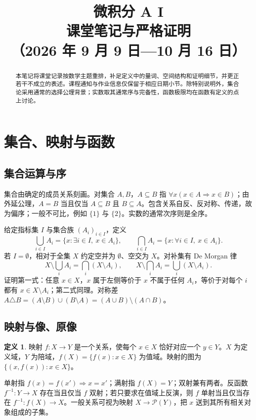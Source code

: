\documentclass[11pt,a4paper,UTF8]{ctexart}
\title{微积分 A I\\课堂笔记与严格证明\\（2026 年 9 月 9 日—10 月 16 日）}
\author{}
\date{}
\theoremstyle{definition}\newtheorem{definition}[theorem]{定义}
\theoremstyle{remark}\newtheorem{remark}[theorem]{说明}
\begin{document}
\maketitle
\begin{abstract}
本笔记将课堂记录按数学主题重排，补足定义中的量词、空间结构和证明细节，并更正若干不成立的表述。课程通知与作业信息仅保留于相应日期小节。除特别说明外，集合论采用通常的选择公理背景；实数取其通常序与完备性，函数极限均在函数有定义的点上讨论。
\end{abstract}
\tableofcontents\newpage

\section{集合、映射与函数}
\subsection{集合运算与序}
集合由确定的成员关系刻画。对集合 $A,B$，$A\subseteq B$ 指 $\forall x(x\in A\Rightarrow x\in B)$；由外延公理，$A=B$ 当且仅当 $A\subseteq B$ 且 $B\subseteq A$。包含关系自反、反对称、传递，故为偏序；一般不可比，例如 $\{1\}$ 与 $\{2\}$。实数的通常次序则是全序。

给定指标集 $I$ 与集合族 $(A_i)_{i\in I}$，定义
\[
\bigcup_{i\in I}A_i=\{x:\exists i\in I,\ x\in A_i\},\qquad
\bigcap_{i\in I}A_i=\{x:\forall i\in I,\ x\in A_i\}.
\]
若 $I=\emptyset$，相对于全集 $X$ 约定空并为 $\emptyset$、空交为 $X$。对补集有 De Morgan 律
\[
X\setminus\bigcup_i A_i=\bigcap_i(X\setminus A_i),\qquad
X\setminus\bigcap_i A_i=\bigcup_i(X\setminus A_i).
\]
证明第一式：任意 $x\in X$，$x$ 属于左侧等价于 $x$ 不属于任何 $A_i$，等价于对每个 $i$ 都有 $x\in X\setminus A_i$；第二式同理。对称差 $A\triangle B=(A\setminus B)\cup(B\setminus A)=(A\cup B)\setminus(A\cap B)$。

\subsection{映射与像、原像}
\begin{definition}
映射 $f:X\to Y$ 是一个关系，使每个 $x\in X$ 恰好对应一个 $y\in Y$。$X$ 为定义域，$Y$ 为陪域，$f(X)=\{f(x):x\in X\}$ 为值域。映射的图为 $\{(x,f(x)):x\in X\}$。
\end{definition}
单射指 $f(x)=f(x')\Rightarrow x=x'$；满射指 $f(X)=Y$；双射兼有两者。反函数 $f^{-1}:Y\to X$ 存在当且仅当 $f$ 双射；若只要求在值域上反演，则 $f$ 单射当且仅当存在 $f^{-1}:f(X)\to X$。一般关系可视为映射 $X\to\mathcal P(Y)$，把 $x$ 送到其所有相关对象组成的子集。
\end{document}
